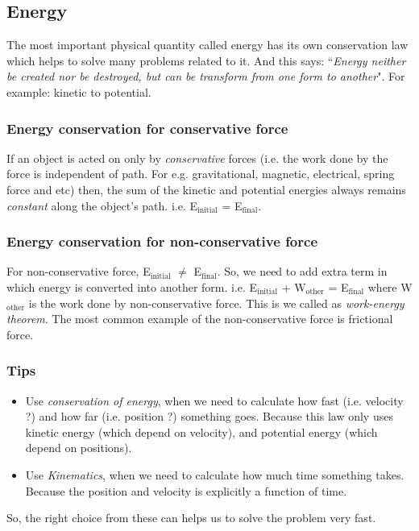 \documentclass[12pt,a4paper]{article}
\begin{document}
\subsection{Energy}

The most important physical quantity called energy has its own conservation law which helps to solve many problems related to it. And this says: ``\emph{Energy neither be created nor be destroyed, but can be transform from one form to another}". For example: kinetic to potential.

\subsubsection{Energy conservation for conservative force}

If an object is acted on only by \emph{conservative} forces (i.e. the work done by the force is independent of path. For e.g. gravitational, magnetic, electrical, spring force and etc) then, the sum of the kinetic and potential energies always remains \emph{constant} along the object's path. i.e. E$_\text{initial}$ = E$_\text{final}$.

\subsubsection{Energy conservation for non-conservative force}

For non-conservative force, E$_\text{initial}$ $\neq$ E$_\text{final}$. So, we need to add extra term in which energy is converted into another form. i.e. E$_\text{initial}$ + W$_\text{other}$ = E$_\text{final}$ where W$_\text{other}$ is the work done by non-conservative force. This is we called as \emph{work-energy theorem}. The most common example of the non-conservative force is frictional force.

\subsubsection*{Tips}
\begin{itemize}
\item Use \emph{conservation of energy}, when we need to calculate how fast (i.e. velocity ?) and how far (i.e. position ?) something goes. Because this law only uses kinetic energy (which depend on velocity), and potential energy (which depend on positions).
\item Use \emph{Kinematics}, when we need to calculate how much time something takes. Because the position and velocity is explicitly a function of time.
\end{itemize}
So, the right choice from these can helps us to solve the problem very fast.
\end{document}
